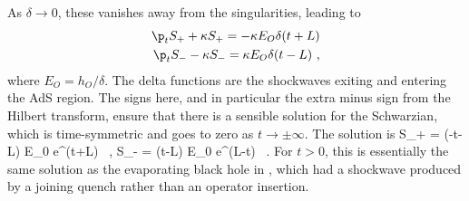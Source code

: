 As $\delta \to 0$, these vanishes away from the singularities, leading to
\begin{align}
\p_t S_+ + \kappa S_+ = - \kappa E_O \delta(t+L) \\
\p_t S_- - \kappa S_- =  \kappa E_O \delta(t-L)  \ ,
\end{align}
where $E_O = h_O/\delta $. 
The delta functions are the shockwaves exiting and entering the AdS region. The signs here, and in particular the extra minus sign from the Hilbert transform, ensure that there is a sensible solution for the Schwarzian, which is time-symmetric and goes to zero as $t\to \pm \infty$. The solution is
\be
S_+ = \Theta(-t-L)
\kappa E_0 e^{\kappa(t+L)} 
\ ,  \qquad
S_- = 
\Theta(t-L) \kappa E_0 e^{\kappa(L-t)} \ .
\ee
For $t>0$, this is essentially the same solution as the evaporating black hole in \cite{Almheiri:2019psf}, which had a shockwave produced by a joining quench rather than an operator insertion. 